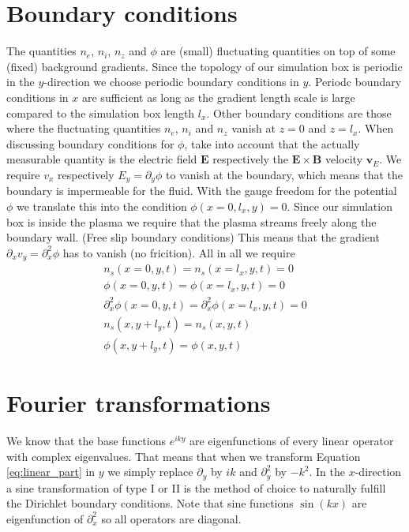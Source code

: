 \documentclass[a4paper,12pt]{scrartcl}
\renewcommand{\vec}[1]{{\mathbf{#1}}}
\begin{document}
\section{ Boundary conditions} 
The quantities $n_e$, $n_i$, $n_z$ and $\phi$ are (small) fluctuating quantities on top of
some (fixed) background gradients. Since the topology of our simulation box is periodic in the $y$-direction 
we choose periodic boundary conditions in $y$. 
Periodc boundary conditions in $x$ are sufficient as long as the gradient length scale is large 
compared to the simulation box length $l_x$.
Other boundary conditions are those where the fluctuating quantities 
$n_e$, $n_i$ and $n_z$ vanish at $z=0$ and $z=l_x$. 
When discussing boundary conditions for $\phi$, take into account that the actually measurable 
quantity is the electric field $\vec E$ respectively the $\vec E \times \vec B$ velocity $\vec v_E$.
We require $v_x $ respectively $E_y = \partial_y\phi$ to vanish at the boundary, which means that the 
boundary is impermeable for the fluid. With the gauge freedom for the potential $\phi$
we translate this into the condition $\phi( x=0,l_x, y) = 0$. Since our simulation box is
inside the plasma we require that the plasma streams freely along the boundary wall.
(Free slip boundary conditions)
This means that the gradient $\partial_x v_y = \partial_x^2 \phi$ has to vanish (no fricition). 
All in all we require
\begin{subequations}
\begin{align}
    n_s( x=0, y,t) = n_s( x=l_x, y,t) = 0 \\
    \phi( x=0, y,t) = \phi( x=l_x, y,t) = 0\\
    \partial_x^2\phi( x=0, y,t) = \partial_x^2\phi( x=l_x, y,t) = 0\\
    n_s( x, y+l_y, t) = n_s( x, y,t) \\
    \phi( x, y+l_y, t) = \phi( x, y,t)
\end{align}
\label{eq:boundary_conditions}
\end{subequations}
\section{Fourier transformations}
\label{sec:fourier}
We know that the base functions $e^{iky}$ are eigenfunctions of every linear
operator with complex eigenvalues. That means that when we transform Equation \ref{eq:linear_part} in $y$ we simply replace $\partial_y$ by $ik$ and $\partial_y^2$ by $-k^2$. 
In the $x$-direction a sine transformation of type I or II is the method of choice 
to naturally fulfill the Dirichlet boundary conditions. Note that sine functions $\sin(k x)$ are 
eigenfunction of $\partial_x^2$ so all operators are diagonal.
\end{document}
